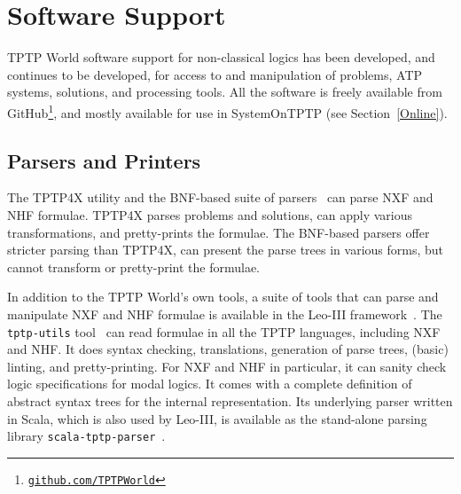 \documentclass{ceurart}
\begin{document}
\section{Software Support}
\label{SystemsTools}

TPTP World software support for non-classical logics has been developed, and continues to be 
developed, for access to and manipulation of problems, ATP systems, solutions, and processing 
tools.
All the software is freely available from GitHub\footnote{%
\href{https://github.com/TPTPWorld}{\tt github.com/TPTPWorld}}, and mostly available for use in 
SystemOnTPTP (see Section~\ref{Online}).

\subsection{Parsers and Printers}
\label{Parsers}

The TPTP4X utility and the BNF-based suite of parsers~\cite{VS06} can parse NXF and NHF formulae.
TPTP4X parses problems and solutions, can apply various transformations, and pretty-prints the 
formulae.
The BNF-based parsers offer stricter parsing than TPTP4X, can present the parse trees in
various forms, but cannot transform or pretty-print the formulae.

In addition to the TPTP World's own tools, a suite of tools that can parse and manipulate 
NXF and NHF formulae is available in the Leo-III framework~\cite{SB21}.
The {\tt tptp-utils} tool~\cite{Ste22-TU} can read formulae in all the TPTP languages, including 
NXF and NHF.
It does syntax checking, translations, generation of parse trees, (basic) linting, and
pretty-printing.
For NXF and NHF in particular, it can sanity check logic specifications for modal logics.
It comes with a complete definition of abstract syntax trees for the internal representation.
Its underlying parser written in Scala, which is also used by Leo-III, is available as the 
stand-alone parsing library {\tt scala-tptp-parser}~\cite{Ste21}.
\end{document}
